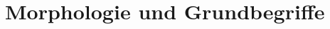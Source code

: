 \documentclass[handout,aspectratio=1610,dvipsnames]{beamer}
\begin{document}
  \section{Morphologie und Grundbegriffe}
  \let\woopsi\section\let\section\subsection\let\subsection\subsubsection
  
  \let\subsection\section\let\section\woopsi
\end{document}
